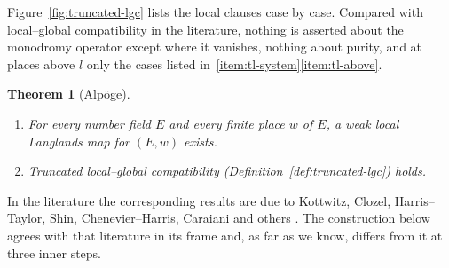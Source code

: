 \documentclass[11pt]{amsbook}
\theoremstyle{plain}
\newtheorem{theorem}{Theorem}[section]
\theoremstyle{definition}
\theoremstyle{remark}
\numberwithin{equation}{section}
\numberwithin{figure}{chapter}
\numberwithin{table}{chapter}
\begin{document}
\noindent Figure~\ref{fig:truncated-lgc} lists the local clauses case by case. Compared with local--global compatibility in the
literature, nothing is asserted about the monodromy operator except
where it vanishes, nothing about purity, and at places above $l$ only
the cases listed in~\ref{item:tl-system}\ref{item:tl-above}.
\begin{figure}[tbp]
\centering

\end{figure}

\begin{theorem}[Alp\"oge]\label{thm:galois-reps}
\begin{enumerate}[label=(\alph*)]
\item\label{item:gr-llc} For every number field $E$ and every finite
place $w$ of $E$, a weak local Langlands map for $(E,w)$ exists.
\item\label{item:gr-lgc} Truncated local--global compatibility
(Definition~\ref{def:truncated-lgc}) holds.
\end{enumerate}
\end{theorem}

\noindent In the literature the corresponding results are due to
Kottwitz, Clozel, Harris--Taylor, Shin, Chenevier--Harris, Caraiani and
others \cite{Kottwitz1992,HarrisTaylor2001,TaylorYoshida2007,Shin2011,
ChenevierHarris2013,Caraiani2012,Caraiani2014,
BarnetLambGeeGeraghtyTaylor2014}. The construction below agrees with
that literature in its frame and, as far as we know, differs from it at
three inner steps.
\end{document}
